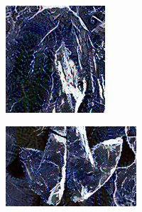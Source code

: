 \begin{figure}[]
\begin{subfigure}{0.6\textwidth}
\begin{subfigure}{0.48\textwidth}
            \hfill
            \begin{subfigure}{0.6\textwidth}
                \centering
                \includegraphics[width=\textwidth]{images/04-experiment02/human/marble/gatys_proj_crop_green.jpg}
                \caption*{}
            \end{subfigure}

            \begin{subfigure}{\textwidth}
                \centering
                \includegraphics[width=\textwidth]{images/04-experiment02/human/marble/gatys_proj_crop_yellow.jpg}
                \caption*{}
            \end{subfigure}
        \end{subfigure}
    \end{subfigure}


\end{figure}
